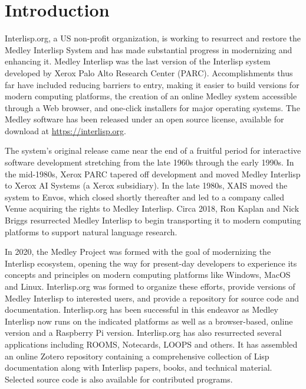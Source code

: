\documentclass[sigconf]{acmart}
\begin{document}

\maketitle

\section{Introduction}
Interlisp.org, a US non-profit organization, is working to resurrect and restore the Medley Interlisp System and has made substantial progress in modernizing and enhancing it. Medley Interlisp was the last version of the Interlisp system developed by Xerox Palo Alto Research Center (PARC). Accomplishments thus far have included reducing  barriers to entry, making it easier to build versions for modern computing platforms, the creation of an online Medley system accessible through a Web browser, and one-click installers for major operating systems. The Medley software has been released under an open source license, available for download at \url{https://interlisp.org}.

The system's original release came near the end of a fruitful period for interactive software development stretching from the late 1960s through the early 1990s. In the mid-1980s, Xerox PARC tapered off development and moved Medley Interlisp to Xerox AI Systems (a Xerox subsidiary). In the late 1980s, XAIS moved the system to Envos, which closed shortly thereafter and led to a company called Venue acquiring the rights to Medley Interlisp. Circa 2018, Ron Kaplan and Nick Briggs resurrected Medley Interlisp to begin transporting it to modern computing platforms to support natural language research.

In 2020, the Medley Project was formed with the goal of modernizing the Interlisp ecosystem, opening the way for present-day developers to experience its concepts and principles on modern computing platforms like Windows, MacOS and Linux. Interlisp.org was formed to organize these efforts, provide versions of Medley Interlisp to interested users, and provide a repository for source code and documentation. Interlisp.org has been successful in this endeavor as Medley Interlisp now runs on the indicated platforms as well as a browser-based, online version and a Raspberry Pi version. Interlisp.org has also resurrected several applications including ROOMS, Notecards, LOOPS and others. It has assembled an online Zotero repository containing a comprehensive collection of Lisp documentation along with Interlisp papers, books, and technical material. Selected source code is also available for contributed programs.
\end{document}
